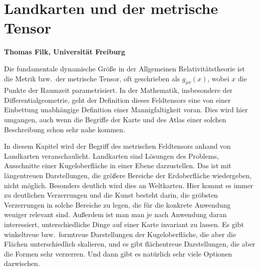
\setcounter{page}{1}
\setcounter{section}{0}
\setcounter{figure}{0}
\setcounter{equation}{0}
\setcounter{table}{0}
\setcounter{footnote}{0}

\section*{Landkarten und der metrische Tensor}
\vspace{0.2cm}
\noindent
{\bf Thomas Filk, Universit\"at Freiburg}
\vspace{1cm}

\label{chap_Landkarte}
Die fundamentale dynamische Gr\"o\ss e in der Allgemeinen Relativit\"atstheorie
ist die Metrik bzw.\ der metrische Tensor, oft geschrieben als $g_{\mu \nu}(x)$, wobei
$x$ die Punkte der Raumzeit parametrisiert. 
In der Mathematik, insbesondere der Differentialgeometrie, geht der
Definition dieses Feldtensors
eine von einer Einbettung unabh\"angige Definition einer Mannigfaltigkeit voran.
Dies wird hier umgangen, auch wenn die Begriffe der Karte und des Atlas einer
solchen Beschreibung schon sehr nahe kommen.  

In diesem Kapitel wird der Begriff des metrischen Feldtensors anhand von Landkarten
veranschaulicht. Landkarten sind L\"osungen des Problems, Ausschnitte einer Kugeloberfl\"ache
in einer Ebene darzustellen. Das ist mit l\"angentreuen Darstellungen, die gr\"o\ss ere Bereiche der
Erdoberfl\"ache wiedergeben, nicht m\"oglich. Besonders deutlich wird dies an Weltkarten. 
Hier kommt es immer zu deutlichen Verzerrungen und die Kunst besteht darin, die gr\"obsten Verzerrungen
in solche Bereiche zu legen, die f\"ur die konkrete Anwendung weniger relevant sind. Au\ss erdem ist man
man je nach Anwendung daran interessiert, unterschiedliche Dinge auf einer Karte
invariant zu lassen. Es gibt winkeltreue bzw.\ formtreue Darstellungen der Kugeloberfl\"ache, die
aber die Fl\"achen unterschiedlich skalieren, und es gibt fl\"achentreue Darstellungen, die
aber die Formen sehr verzerren. Und dann gibt es nat\"urlich sehr viele Optionen
dazwischen. 

